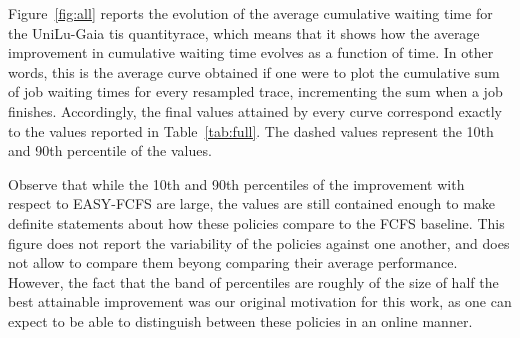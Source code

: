\documentclass[sigconf,anonymous]{acmart}
\begin{document}
Figure~\ref{fig:all} reports the evolution of the average cumulative waiting
time for the UniLu-Gaia tis quantityrace, which means that it shows how the
average improvement in cumulative waiting time evolves as a function of time.
In other words, this is the average curve obtained if one were to plot the
cumulative sum of job waiting times for every resampled trace, incrementing the
sum when a job finishes. Accordingly, the final values attained by every curve
correspond exactly to the values reported in Table~\ref{tab:full}. The dashed
values represent the 10th and 90th percentile of the values.

Observe that while the 10th and 90th percentiles of the improvement with
respect to EASY-FCFS are large, the values are still contained enough to make
definite statements about how these policies compare to the FCFS baseline.
This figure does not report the variability of the policies against one another,
and does not allow to compare them beyong comparing their average performance.
However, the fact that the band of percentiles are roughly of the size of half
the best attainable improvement was our original motivation for this work, as
one can expect to be able to distinguish between these policies in an
online manner.
\end{document}
